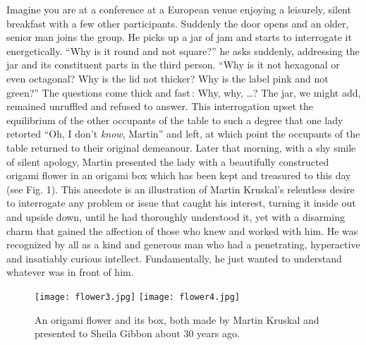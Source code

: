 \documentclass[11pt]{article}
\newcommand{\bc}{\begin{center}}
\newcommand{\ec}{\end{center}}
\begin{document}
Imagine you are at a conference at a European venue enjoying a leisurely, silent breakfast with a few other participants. 
Suddenly the door opens and an older, senior man joins the group. He picks up a jar of jam and starts to interrogate it 
energetically. ``Why is it round and not square?'' he asks suddenly, addressing the jar and its constituent parts in the 
third person. ``Why is it not hexagonal or even octagonal? Why is the lid not thicker? Why is the label pink and not 
green?'' The questions come thick and fast\,: Why, why, \ldots? The jar, we might add, remained unruffled and refused 
to answer. This interrogation upset the equilibrium of the other occupants of the table to such a degree that one lady 
retorted ``Oh, I don't \textit{know}, Martin'' and left, at which point the occupants of the table returned to their 
original demeanour. Later that morning, with a shy smile of silent apology, Martin presented the lady with a beautifully constructed origami flower in an origami box which has been kept and treasured to this day (see Fig. 1). This anecdote 
is an illustration of Martin Kruskal's relentless desire to interrogate any problem or issue that caught his interest, 
turning it inside out and upside down, until he had thoroughly understood it, yet with a disarming charm that gained 
the affection of those who knew and worked with him. He was recognized by all as a kind and generous man who had a 
penetrating, hyperactive and insatiably curious intellect. Fundamentally, he just wanted to understand whatever was 
in front of him. 
\begin{figure}
\bc
\texttt{[image: flower3.jpg]}\qquad
\texttt{[image: flower4.jpg]}
\ec
\caption{\scriptsize An origami flower and its box, both made by Martin Kruskal and presented to Sheila Gibbon about 30 years ago.}
\end{figure}
\par\indent\noindent
\end{document}
